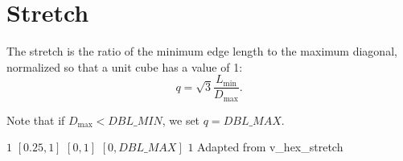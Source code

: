 \section{Stretch}

The stretch is the ratio of the minimum edge length to the maximum diagonal, normalized
so that a unit cube has a value of 1:
\[
  q = \sqrt{3}\frac{L_{\min}}{D_{\max}}.
\]

Note that if $D_{\max} < DBL\_MIN$, we set $q = DBL\_MAX$.

%
{$1$}%
{$[0.25,1]$}%
{$[0,1]$}%
{$[0,DBL\_MAX]$}%
{$1$}%
{Adapted from \cite{fimesh:xx}}%
{v\_hex\_stretch}%
